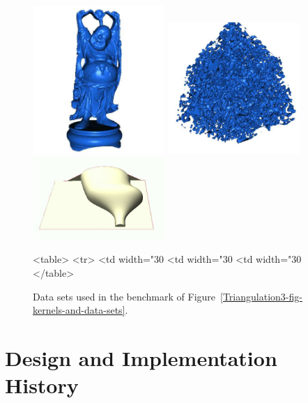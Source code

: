 \begin{figure}[htbp]
\begin{center} 
\begin{ccTexOnly}
\includegraphics[width=5cm]{Triangulation_3/fig/api1_01} 
\includegraphics[width=5cm]{Triangulation_3/fig/b35-1} 
\includegraphics[width=5cm]{Triangulation_3/fig/HD} 
\end{ccTexOnly}
\begin{ccHtmlOnly}
<table>
<tr>
<td width="30%
<td width="30%
<td width="30%
</table>
\end{ccHtmlOnly}
\end{center}
\caption{Data sets used in the benchmark of Figure~\ref{Triangulation3-fig-kernels-and-data-sets}.
\label{Triangulation3-fig-data-sets}}
\end{figure} 



\section{Design and Implementation History}

